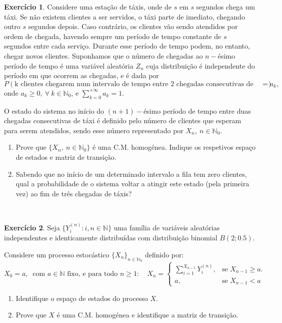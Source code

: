 \documentclass[
  11pt,
  a4paper,
]{book}
\theoremstyle{definition}
\theoremstyle{definition}
\theoremstyle{definition}
\newtheorem{exercise}{Exercício}[chapter]
\theoremstyle{definition}
\theoremstyle{remark}
\begin{document}
\begin{exercise}

Considere uma estação de táxis, onde de \(s\) em \(s\) segundos chega um táxi. Se não existem clientes a ser servidos, o táxi parte de imediato, chegando outro \(s\) segundos depois. Caso contrário, os clientes vão sendo atendidos por ordem de chegada, havendo sempre um período de tempo constante de \(s\) segundos entre cada serviço. Durante esse período de tempo podem, no entanto, chegar novos clientes. Suponhamos que o número de chegadas ao \(n-\)ésimo período de tempo é uma variável aleatória \(Z_n\) cuja distribuição é independente do período em que ocorrem as chegadas, e é dada por
\[P(\text{k clientes chegarem num intervalo de tempo entre 2 chegadas consecutivas de táxi})= a_k,\]
onde \(a_k \geq 0, ~\forall ~k \in \mathbb{N}_0\), e \(\sum\limits_{k=0}^{+\infty}a_k=1\).

O estado do sistema no início do \((n+1)-\)ésimo período de tempo entre duas chegadas consecutivas de táxi é definido pelo número de clientes que esperam para serem atendidos, sendo esse número representado por \(X_n, ~n \in \mathbb{N}_0\).

\begin{enumerate}
\def\labelenumi{(\alph{enumi})}
\item
  Prove que \(\{X_n, ~n \in \mathbb{N}_0\}\) é uma C.M. homogénea. Indique os respetivos espaço de estados e matriz de transição.
\item
  Sabendo que no início de um determinado intervalo a fila tem zero clientes, qual a probabilidade de o sistema voltar a atingir este estado (pela primeira vez) ao fim de três chegadas de táxis?
\end{enumerate}

\end{exercise}

\(\,\)

\begin{exercise}

Seja \(\{Y_i^{(n)} : i, n \in \mathbb{N} \}\) uma família de variáveis aleatórias independentes e identicamente distribuídas com distribuição binomial \(B(2; 0.5)\).

Considere um processo estocástico \(\{X_n\}_{n \in \mathbb{N}_0}\) definido por:
\[
X_0 = a, ~\text{ com } a \in \mathbb{N} \text{ fixo, e para todo } n \geq 1:
\quad X_n =
\begin{cases}
\sum\limits_{i=1}^{X_{n-1}} Y_i^{(n)}, & \text{se } X_{n-1} \geq a. \\
a, & \text{se } X_{n-1} < a
\end{cases}
\]

\begin{enumerate}
\def\labelenumi{(\alph{enumi})}
\item
  Identifique o espaço de estados do processo \(X\).
\item
  Prove que \(X\) é uma C.M. homogénea e identifique a matriz de transição.
\end{enumerate}

\end{exercise}
\end{document}
